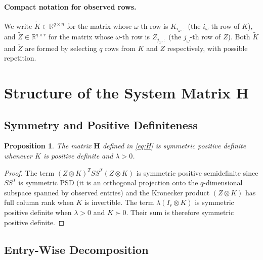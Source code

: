 \documentclass[12pt]{article}
\newtheorem{proposition}[theorem]{Proposition}
\theoremstyle{definition}
\begin{document}
\paragraph{Compact notation for observed rows.}
We write $\widetilde{K} \in \mathbb{R}^{q \times n}$ for the matrix whose $\omega$-th row is
$K_{i_\omega,:}$ (the $i_\omega$-th row of $K$), and $\widetilde{Z} \in \mathbb{R}^{q \times r}$
for the matrix whose $\omega$-th row is $Z_{j_\omega,:}$ (the $j_\omega$-th row of $Z$).
Both $\widetilde{K}$ and $\widetilde{Z}$ are formed by selecting $q$ rows from $K$ and $Z$
respectively, with possible repetition.

\section{Structure of the System Matrix $\mathbf{H}$}

\subsection{Symmetry and Positive Definiteness}

\begin{proposition}
  The matrix $\mathbf{H}$ defined in \eqref{eq:H} is symmetric positive definite whenever $K$
  is positive definite and $\lambda > 0$.
\end{proposition}

\begin{proof}
  The term $(Z \otimes K)^T SS^T (Z \otimes K)$ is symmetric positive semidefinite since
  $SS^T$ is symmetric PSD (it is an orthogonal projection onto the $q$-dimensional subspace
  spanned by observed entries) and the Kronecker product $(Z \otimes K)$ has full column rank
  when $K$ is invertible.  The term $\lambda(I_r \otimes K)$ is symmetric positive definite
  when $\lambda > 0$ and $K \succ 0$.  Their sum is therefore symmetric positive definite.
\end{proof}

\subsection{Entry-Wise Decomposition}
\end{document}
